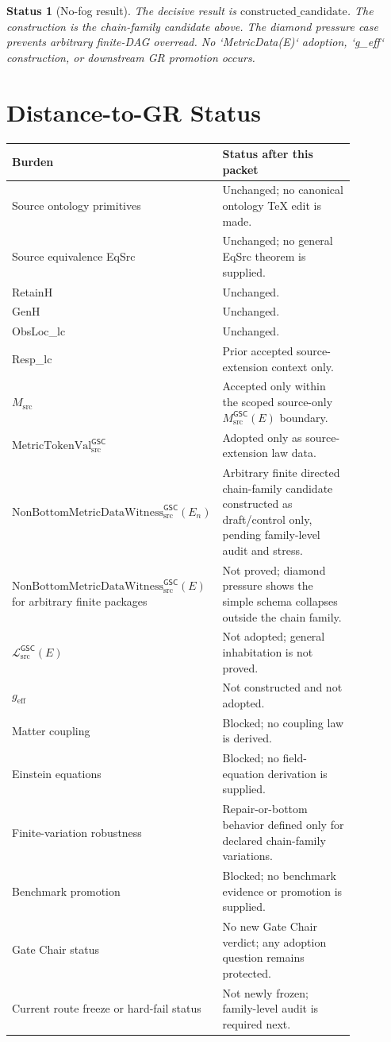 \documentclass[11pt]{article}
\newcommand{\MetricTokenVal}{\mathrm{MetricTokenVal}_{\mathrm{src}}^{\mathsf{GSC}}}
\newcommand{\Witness}{\mathrm{NonBottomMetricDataWitness}_{\mathrm{src}}^{\mathsf{GSC}}}
\newcommand{\MetricData}{\mathcal{L}_{\mathrm{src}}^{\mathsf{GSC}}}
\newcommand{\geff}{g_{\mathrm{eff}}}
\newcommand{\En}{E_n}
\newtheorem{status}{Status}
\begin{document}
\begin{status}[No-fog result]
The decisive result is \(\mathrm{constructed\_candidate}\). The construction
is the chain-family candidate above. The diamond pressure case prevents
arbitrary finite-DAG overread. No `MetricData(E)` adoption, `g_eff`
construction, or downstream GR promotion occurs.
\end{status}

\section{Distance-to-GR Status}

\begin{longtable}{p{0.30\linewidth}p{0.56\linewidth}}
\toprule
Burden & Status after this packet \\
\midrule
Source ontology primitives & Unchanged; no canonical ontology TeX edit is made. \\
Source equivalence EqSrc & Unchanged; no general EqSrc theorem is supplied. \\
RetainH & Unchanged. \\
GenH & Unchanged. \\
ObsLoc\_lc & Unchanged. \\
Resp\_lc & Prior accepted source-extension context only. \\
\(M_{\mathrm{src}}\) & Accepted only within the scoped source-only
\(M_{\mathrm{src}}^{\mathsf{GSC}}(E)\) boundary. \\
\(\MetricTokenVal\) & Adopted only as source-extension law data. \\
\(\Witness(\En)\) & Arbitrary finite directed chain-family candidate
constructed as draft/control only, pending family-level audit and stress. \\
\(\Witness(E)\) for arbitrary finite packages & Not proved; diamond pressure
shows the simple schema collapses outside the chain family. \\
\(\MetricData(E)\) & Not adopted; general inhabitation is not proved. \\
\(\geff\) & Not constructed and not adopted. \\
Matter coupling & Blocked; no coupling law is derived. \\
Einstein equations & Blocked; no field-equation derivation is supplied. \\
Finite-variation robustness & Repair-or-bottom behavior defined only for
declared chain-family variations. \\
Benchmark promotion & Blocked; no benchmark evidence or promotion is supplied. \\
Gate Chair status & No new Gate Chair verdict; any adoption question remains protected. \\
Current route freeze or hard-fail status & Not newly frozen; family-level audit is required next. \\
\bottomrule
\end{longtable}
\end{document}
